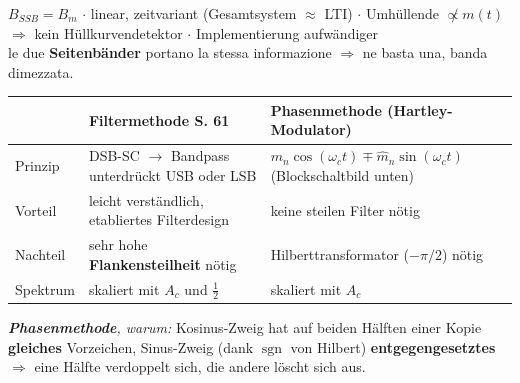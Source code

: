$B_{SSB} = B_m$ $\cdot$ linear, zeitvariant (Gesamtsystem $\approx$ LTI) $\cdot$ Umhüllende $\not\propto m(t)$ $\Rightarrow$ kein Hüllkurvendetektor $\cdot$ Implementierung aufwändiger\\
le due \textbf{Seitenbänder} portano la stessa informazione $\Rightarrow$ ne basta una, banda dimezzata.

\vspace{.1cm}
{\small\renewcommand{\arraystretch}{1.15}
\noindent\begin{tabularx}{\linewidth}{|l|X|X|}
	\hline
	& \textbf{Filtermethode} S. 61 & \textbf{Phasenmethode} (Hartley-Modulator) \\ \hline
	Prinzip & DSB-SC $\rightarrow$ Bandpass unterdrückt USB oder LSB & $m_n\cos(\omega_c t) \mp \hat m_n \sin(\omega_c t)$ (Blockschaltbild unten) \\
	Vorteil & leicht verständlich, etabliertes Filterdesign & keine steilen Filter nötig \\
	Nachteil & sehr hohe \textbf{Flankensteilheit} nötig & Hilberttransformator ($-\pi/2$) nötig \\
	Spektrum & skaliert mit $A_c$ und $\frac12$ & skaliert mit $A_c$ \\ \hline
\end{tabularx}}\smallbreak

{\color{accent}\textit{\textbf{Phasenmethode}, warum:}} Kosinus-Zweig hat auf beiden Hälften einer Kopie \textbf{gleiches} Vorzeichen, Sinus-Zweig (dank $\operatorname{sgn}$ von Hilbert) \textbf{entgegengesetztes} $\Rightarrow$ eine Hälfte verdoppelt sich, die andere löscht sich aus.

